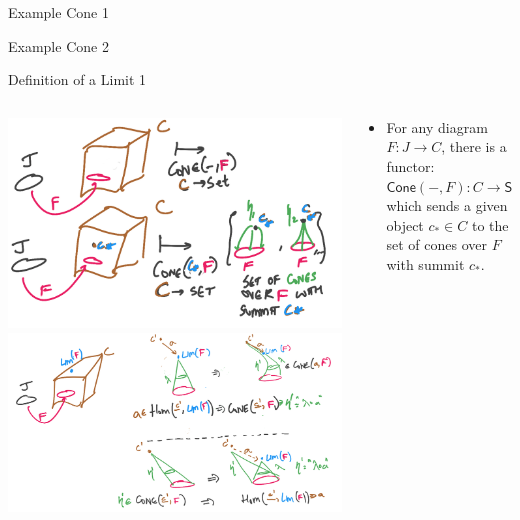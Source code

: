 \documentclass[8pt]{beamer}
\newcommand{\cat}[1]{\mathsf{#1}}
\newcommand{\cSet}{\cat{Set}}
\newcommand{\cCone}{\cat{Cone}}
\begin{document}
\begin{frame}{Example Cone 1}
\end{frame}

\begin{frame}{Example Cone 2}
\end{frame}

\begin{frame}{Definition of a Limit 1}
    \begin{columns}[T] %
        \begin{column}{.48\textwidth}
            \includegraphics[width=\textwidth]{./cone-functor.png}
            \includegraphics[width=\textwidth]{./natural-iso-limit-cone.png}
        \end{column}
        \begin{column}{.6\textwidth}
     \begin{itemize}
         \item For any diagram $F: J \to C$, there is a functor: $\cCone(-, F): C \to \cSet$ which sends
             a given object $c_* \in C$  to the set of cones over $F$ with summit $c_*$. \pause

\end{itemize}
\end{column}
\end{columns}
\end{frame}
\end{document}
